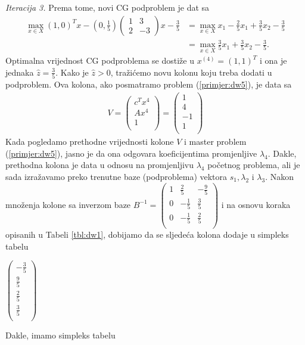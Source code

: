 \documentclass[a4paper, utf8, 11pt, colorlinks]{book}
\theoremstyle{definition}
\begin{document}
  
  \vspace{5mm}
   \emph{Iteracija 3.} Prema tome, novi CG podproblem je dat sa 
  \begin{align*}
        \max_{x \in X} (1, 0)^T x - (0, \frac{1}{5})\left(\begin{array}{cc}
       	1 & 3 \\
       	2 & -3
       \end{array}\right)  x   - \frac{3}{5} &= \max_{x \in X}x_1  - \frac{2}{5}x_1 + \frac{3}{5}x_2 - \frac{3}{5} \\
       &= \max_{x \in X} \frac{3}{5}x_1 + \frac{3}{5}x_2 - \frac{3}{5}.
  \end{align*} 
Optimalna vrijednost CG podproblema se dostiže u $x^{(4)} = (1, 1)^T$ i ona je jednaka $\hat{z}=\frac{3}{5}$. Kako je $\hat{z}>0$, tražićemo novu kolonu koju treba dodati u podproblem. Ova kolona, ako posmatramo problem (\ref{primjer:dw5}), je   data sa 
\begin{align}
	V =   \begin{pmatrix}
		c^T x^4\\
		A x^4  \\
		1     \\
	\end{pmatrix} = \begin{pmatrix}
		1 \\
		4  \\
		-1  \\
		1\\  
	\end{pmatrix}
\end{align}
Kada pogledamo prethodne vrijednosti kolone $V$ i master problem (\ref{primjer:dw5}), jasno je da ona odgovara koeficijentima promjenljive $\lambda_4$. Dakle, prethodna kolona je data u odnosu na promjenljivu $\lambda_4$ početnog problema, ali je sada izražavamo preko trenutne baze (podproblema) vektora $s_1, \lambda_2$ i $\lambda_3$.  Nakon množenja kolone sa inverzom baze 
$B^{-1}= 
\begin{pmatrix}
	 1 &  \frac{2}{5}   & -\frac{9}{5} \\
	 0 &  -\frac{1}{5}  & \frac{3}{5}  \\
	 0 &  -\frac{1}{5}  & \frac{2}{5}  \\ 
\end{pmatrix} $ i na osnovu koraka opisanih u Tabeli \ref{tbl:dw1}, dobijamo da se sljedeća kolona dodaje u simpleks tabelu

\begin{center}
	
	$\begin{pmatrix}
		-\frac{3}{5}            \\
		\frac{9}{5}     \\
		 \frac{2}{5}       \\
		\frac{3}{5}    \\
	\end{pmatrix}$
\end{center}
Dakle, imamo simpleks tabelu 
\end{document}
